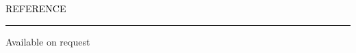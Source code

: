 \documentclass{resume} %
\renewenvironment{rSection}[1]{
	\sectionskip
	\textcolor{Black}{\MakeUppercase{#1}}
	\sectionlineskip
	\hrule
	\begin{list}{}{
			\setlength{\leftmargin}{1.5em}
		}
		\item[]
	}{
	\end{list}
}
\begin{document}
	
	\begin{rSection}{Reference}
	Available on request
				
	\end{rSection}
		
	
\end{document}
